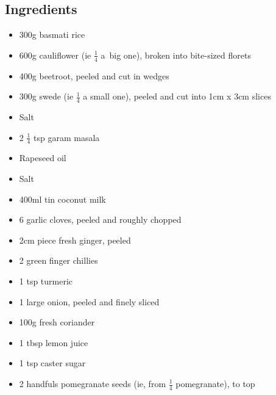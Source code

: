 \documentclass{book}
\begin{document}
\subsection*{Ingredients}
\begin{itemize}
\item 300g basmati rice
\item 600g cauliflower (ie $\frac{1}{4}$ a big one), broken into bite-sized florets
\item 400g beetroot, peeled and cut in wedges 
\item 300g swede (ie $\frac{1}{4}$ a small one), peeled and cut into 1cm x 3cm slices 
\item Salt
\item 2 $\frac{1}{4}$ tsp garam masala 
\item Rapeseed oil
\item Salt 
\item 400ml tin coconut milk 
\item 6 garlic cloves, peeled and roughly chopped 
\item 2cm piece fresh ginger, peeled
\item 2 green finger chillies 
\item 1 tsp turmeric
\item 1 large onion, peeled and finely sliced
\item 100g fresh coriander 
\item 1 tbsp lemon juice 
\item 1 tsp caster sugar
\item 2 handfuls pomegranate seeds (ie, from $\frac{1}{4}$ pomegranate), to top 
\end{itemize}
\end{document}
